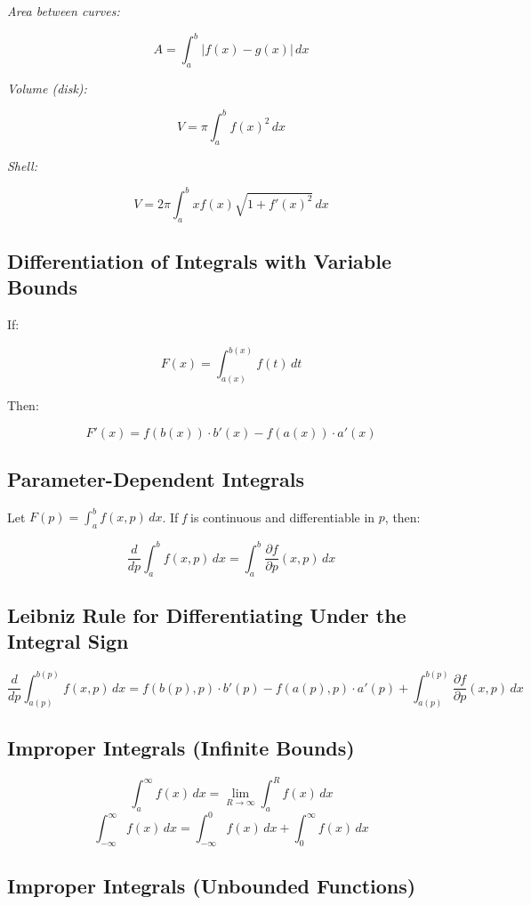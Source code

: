 \emph{Area between curves:}

\[
    A = \int_a^b |f(x) - g(x)|\,dx
\]

\emph{Volume (disk):}

\[
    V = \pi \int_a^b {f(x)}^2\,dx
\]

\emph{Shell:}

\[
    V = 2\pi \int_a^b x f(x) \sqrt{1 + {f'(x)}^2}\,dx
\]

\subsection{Differentiation of Integrals with Variable Bounds}

If:

\[
    F(x) = \int_{a(x)}^{b(x)} f(t)\,dt
\]

Then:

\[
    F'(x) = f(b(x)) \cdot b'(x) - f(a(x)) \cdot a'(x)
\]

\subsection{Parameter-Dependent Integrals}

Let \(F(p) = \int_a^b f(x, p)\,dx\). If \emph{f} is continuous and differentiable in \(p\), then:

\[
    \frac{d}{dp} \int_a^b f(x, p)\,dx = \int_a^b \frac{\partial f}{\partial p}(x, p)\,dx
\]

\subsection{Leibniz Rule for Differentiating Under the Integral Sign}

\[
    \frac{d}{dp} \int_{a(p)}^{b(p)} f(x, p)\,dx = f(b(p), p) \cdot b'(p) - f(a(p), p) \cdot a'(p) + \int_{a(p)}^{b(p)} \frac{\partial f}{\partial p}(x, p)\,dx
\]

\subsection{Improper Integrals (Infinite Bounds)}

\[
    \int_a^\infty f(x)\,dx = \lim_{R \to \infty} \int_a^R f(x)\,dx
\]
\[
    \int_{-\infty}^\infty f(x)\,dx = \int_{-\infty}^0 f(x)\,dx + \int_0^\infty f(x)\,dx
\]

\subsection{Improper Integrals (Unbounded Functions)}

